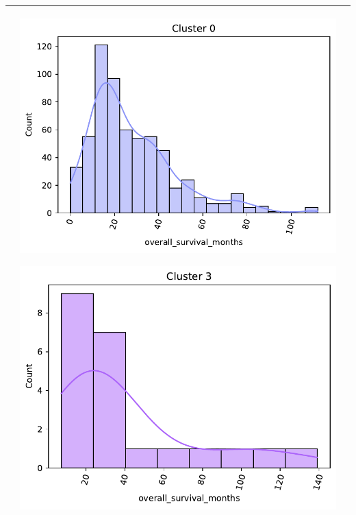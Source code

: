 \begin{table}
\begin{threeparttable}
\begin{tabular}{p{2.5cm} p{7cm} p{6.5cm}}
			& 
			\begin{center}\includegraphics[width=1\linewidth]{NOTEBOOK/IMAGENES_BIRCH_CLUSTERING/9_Cluster_0_overall_survival_months}\end{center}
			\begin{center}\includegraphics[width=1\linewidth]{NOTEBOOK/IMAGENES_BIRCH_CLUSTERING/9_Cluster_3_overall_survival_months}\end{center}
			
			\\ \hline
		\end{tabular}
	\end{threeparttable}
\end{table}
\clearpage
